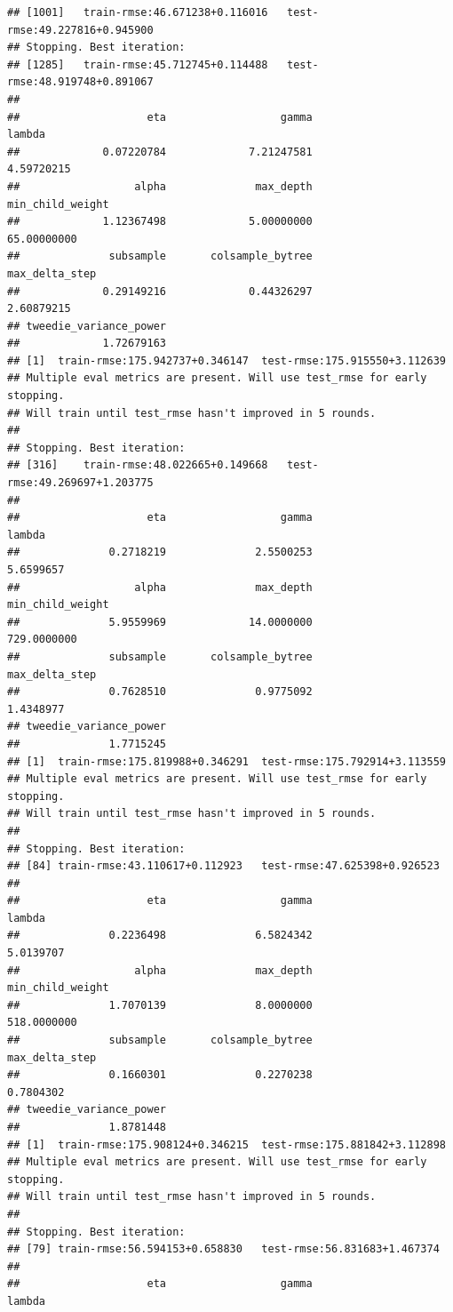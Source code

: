 \documentclass[
]{article}
\begin{document}
\begin{verbatim}
## [1001]   train-rmse:46.671238+0.116016   test-rmse:49.227816+0.945900 
## Stopping. Best iteration:
## [1285]   train-rmse:45.712745+0.114488   test-rmse:48.919748+0.891067
## 
##                    eta                  gamma                 lambda 
##             0.07220784             7.21247581             4.59720215 
##                  alpha              max_depth       min_child_weight 
##             1.12367498             5.00000000            65.00000000 
##              subsample       colsample_bytree         max_delta_step 
##             0.29149216             0.44326297             2.60879215 
## tweedie_variance_power 
##             1.72679163 
## [1]  train-rmse:175.942737+0.346147  test-rmse:175.915550+3.112639 
## Multiple eval metrics are present. Will use test_rmse for early stopping.
## Will train until test_rmse hasn't improved in 5 rounds.
## 
## Stopping. Best iteration:
## [316]    train-rmse:48.022665+0.149668   test-rmse:49.269697+1.203775
## 
##                    eta                  gamma                 lambda 
##              0.2718219              2.5500253              5.6599657 
##                  alpha              max_depth       min_child_weight 
##              5.9559969             14.0000000            729.0000000 
##              subsample       colsample_bytree         max_delta_step 
##              0.7628510              0.9775092              1.4348977 
## tweedie_variance_power 
##              1.7715245 
## [1]  train-rmse:175.819988+0.346291  test-rmse:175.792914+3.113559 
## Multiple eval metrics are present. Will use test_rmse for early stopping.
## Will train until test_rmse hasn't improved in 5 rounds.
## 
## Stopping. Best iteration:
## [84] train-rmse:43.110617+0.112923   test-rmse:47.625398+0.926523
## 
##                    eta                  gamma                 lambda 
##              0.2236498              6.5824342              5.0139707 
##                  alpha              max_depth       min_child_weight 
##              1.7070139              8.0000000            518.0000000 
##              subsample       colsample_bytree         max_delta_step 
##              0.1660301              0.2270238              0.7804302 
## tweedie_variance_power 
##              1.8781448 
## [1]  train-rmse:175.908124+0.346215  test-rmse:175.881842+3.112898 
## Multiple eval metrics are present. Will use test_rmse for early stopping.
## Will train until test_rmse hasn't improved in 5 rounds.
## 
## Stopping. Best iteration:
## [79] train-rmse:56.594153+0.658830   test-rmse:56.831683+1.467374
## 
##                    eta                  gamma                 lambda 

\end{verbatim}
\end{document}
